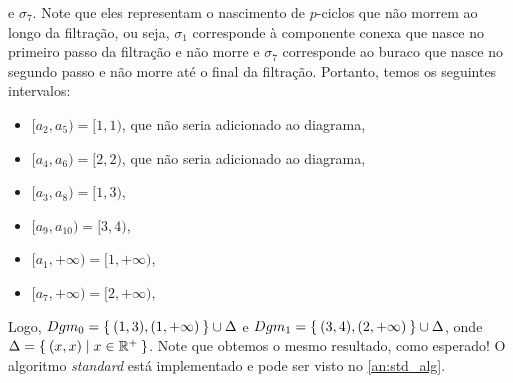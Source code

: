 e $\sigma_7$. Note que eles representam o nascimento de $p$-ciclos que não morrem
ao longo da filtração, ou seja, $\sigma_1$ corresponde à componente conexa que
nasce no primeiro passo da filtração e não morre e $\sigma_7$ corresponde ao
buraco que nasce no segundo passo e não morre até o final da filtração.
Portanto, temos os seguintes intervalos:
\begin{itemize}
  \item $[a_2,a_5) = [1,1)$, que não seria adicionado ao diagrama,
  \item $[a_4,a_6) = [2,2)$, que não seria adicionado ao diagrama,
  \item $[a_3,a_8) = [1,3)$,
  \item $[a_9,a_10) = [3,4)$,
  \item $[a_1,+\infty) = [1,+\infty)$,
  \item $[a_7,+\infty) = [2,+\infty)$,
\end{itemize}
Logo, $Dgm_0 = \Set{(1,3), (1,+\infty)} \cup \Delta$ e $Dgm_1 = \Set{(3,4),
(2,+\infty)} \cup \Delta$, onde $\Delta = \Set{(x,x) | x \in \mathbb{R}^+}$.
Note que obtemos o mesmo resultado, como esperado! O algoritmo \textit{standard}
está implementado e pode ser visto no \autoref{an:std_alg}.
